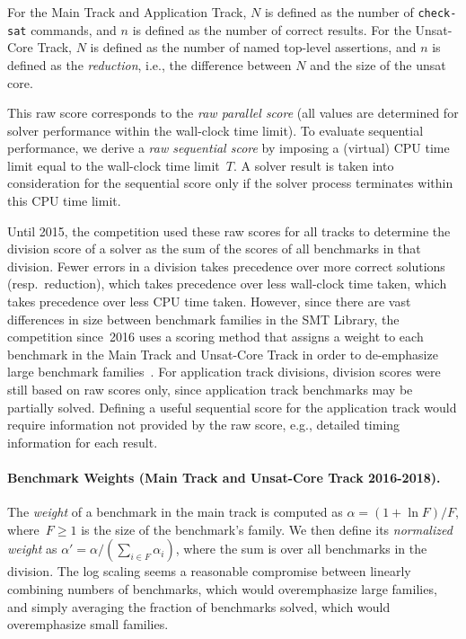 \documentclass[dvipsnames,table,twoside,11pt]{article}
\newcommand{\maintrack}{Main Track\xspace}
\newcommand{\apptrack}{Application Track\xspace}
\newcommand{\ucoretrack}{Unsat-Core Track\xspace}
\begin{document}
For the \maintrack and \apptrack,
$N$ is defined as the number of {\tt check-sat} commands, and
$n$ is defined as the number of correct results.
For the \ucoretrack, $N$ is defined as the number of named top-level assertions,
and $n$ is defined as the \emph{reduction}, i.e., the difference between $N$
and the size of the unsat core.

This raw score corresponds to the \emph{raw parallel score} (all values are
determined for solver performance within the wall-clock time limit).  To
evaluate sequential performance, we derive a \emph{raw sequential score} by
imposing a (virtual) CPU time limit equal to the wall-clock time limit~$T$.  A
solver result is taken into consideration for the sequential score only if the
solver process terminates within this CPU time limit.

Until 2015, the competition used these raw scores for all tracks to determine
the division score of a solver as the sum of the scores of all benchmarks in
that division.
Fewer errors in a division takes precedence over more correct solutions
(resp.~reduction), which takes precedence over less wall-clock time taken,
which takes precedence over less CPU time taken.
However, since there are vast differences in size between benchmark families in
the SMT Library, the competition since~2016 uses a scoring method that assigns
a weight to each benchmark in the \maintrack and \ucoretrack in order to
de-emphasize large benchmark families~\cite{rules16,rules17,rules18}.
For application track divisions, division scores were still based on raw scores
only, since application track benchmarks may be partially solved. Defining a
useful sequential score for the application track would require information not
provided by the raw score, e.g., detailed timing information for each result.

\paragraph{Benchmark Weights (\maintrack and \ucoretrack 2016-2018).} The \emph{weight} of a
benchmark in the main track is computed as $\alpha = (1 + \ln F)/F$,
where~$F\geq 1$ is the size of the benchmark's family.  We then define its
\emph{normalized weight} as $\alpha' = \alpha / (\sum_{i\in F} \alpha_i)$,
where the sum is over all benchmarks in the division.  The log scaling seems a
reasonable compromise between linearly combining numbers of benchmarks, which
would overemphasize large families, and simply averaging the fraction of
benchmarks solved, which would overemphasize small families.
\end{document}
